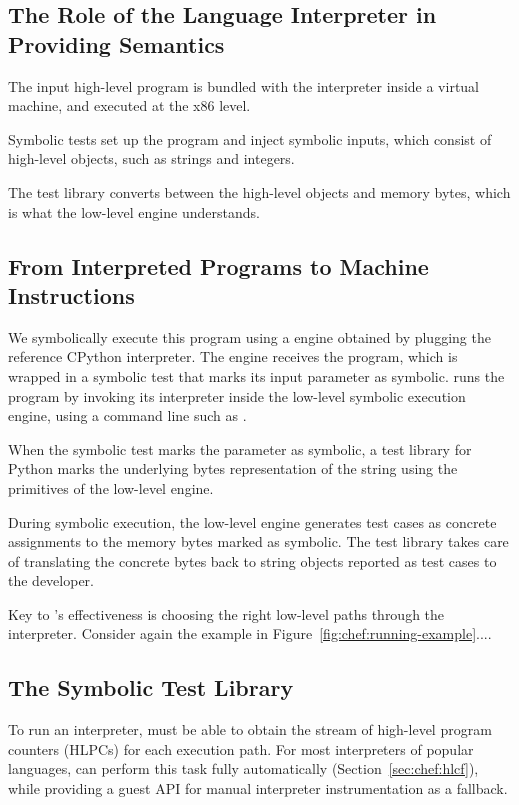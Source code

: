 \subsection{The Role of the Language Interpreter in Providing Semantics}

The input high-level program is bundled with the interpreter inside a virtual machine, and executed at the x86 level.

Symbolic tests set up the program and inject symbolic inputs, which consist of high-level objects, such as strings and integers.

The test library converts between the high-level objects and memory bytes, which is what the low-level engine understands.

\subsection{From Interpreted Programs to Machine Instructions}

We symbolically execute this program using a \chef engine obtained by plugging the reference CPython interpreter.
%
The \chef engine receives the program, which is wrapped in a symbolic test that marks its input parameter  as symbolic.
%
\chef runs the program by invoking its interpreter inside the low-level symbolic execution engine, using a command line such as .

When the symbolic test marks the  parameter as symbolic, a \chef test library for Python marks the underlying bytes representation of the string using the primitives of the low-level engine.

During symbolic execution, the low-level engine generates test cases as concrete assignments to the memory bytes marked as symbolic.
%
The \chef test library takes care of translating the concrete bytes back to string objects reported as test cases to the developer.

Key to \chef's effectiveness is choosing the right low-level paths through the interpreter.
%
Consider again the example in Figure~\ref{fig:chef:running-example}....

\subsection{The Symbolic Test Library}


To run an interpreter, \chef must be able to obtain the stream of high-level program counters (HLPCs) for each execution path.  For most interpreters of popular languages, \chef can perform this task fully automatically (Section~\ref{sec:chef:hlcf}), while providing a guest API for manual interpreter instrumentation as a fallback.

